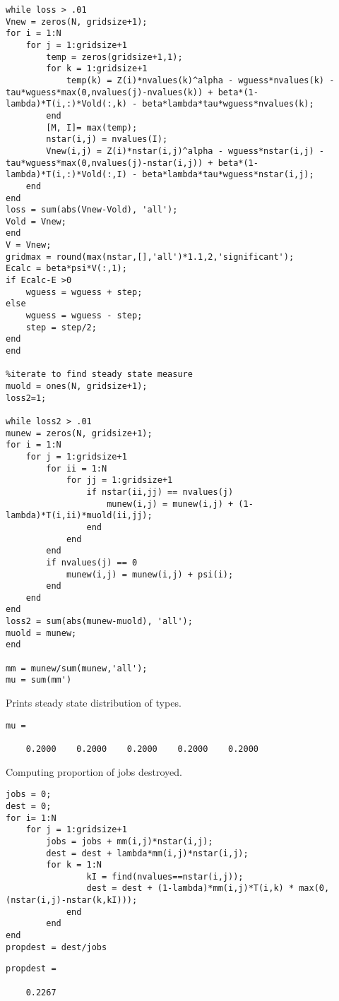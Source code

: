 \documentclass[12pt]{article}
\begin{document}
\begin{onehalfspace}
\begin{enumerate}[1.]
\begin{enumerate}
\begin{lstlisting}
while loss > .01
Vnew = zeros(N, gridsize+1);
for i = 1:N
    for j = 1:gridsize+1
        temp = zeros(gridsize+1,1);
        for k = 1:gridsize+1
            temp(k) = Z(i)*nvalues(k)^alpha - wguess*nvalues(k) - tau*wguess*max(0,nvalues(j)-nvalues(k)) + beta*(1-lambda)*T(i,:)*Vold(:,k) - beta*lambda*tau*wguess*nvalues(k);
        end
        [M, I]= max(temp);
        nstar(i,j) = nvalues(I);
        Vnew(i,j) = Z(i)*nstar(i,j)^alpha - wguess*nstar(i,j) - tau*wguess*max(0,nvalues(j)-nstar(i,j)) + beta*(1-lambda)*T(i,:)*Vold(:,I) - beta*lambda*tau*wguess*nstar(i,j);
    end
end
loss = sum(abs(Vnew-Vold), 'all');
Vold = Vnew;
end
V = Vnew;
gridmax = round(max(nstar,[],'all')*1.1,2,'significant');
Ecalc = beta*psi*V(:,1);
if Ecalc-E >0
    wguess = wguess + step;
else
    wguess = wguess - step;
    step = step/2;
end
end

%iterate to find steady state measure
muold = ones(N, gridsize+1);
loss2=1;

while loss2 > .01
munew = zeros(N, gridsize+1);
for i = 1:N
    for j = 1:gridsize+1
        for ii = 1:N
            for jj = 1:gridsize+1
                if nstar(ii,jj) == nvalues(j)
                    munew(i,j) = munew(i,j) + (1-lambda)*T(i,ii)*muold(ii,jj);
                end
            end
        end
        if nvalues(j) == 0
            munew(i,j) = munew(i,j) + psi(i);
        end
    end
end
loss2 = sum(abs(munew-muold), 'all');
muold = munew;
end

mm = munew/sum(munew,'all');
mu = sum(mm')
\end{lstlisting}
Prints steady state distribution of types.
\begin{lstlisting}
mu =

    0.2000    0.2000    0.2000    0.2000    0.2000
\end{lstlisting}
Computing proportion of jobs destroyed.
\begin{lstlisting}
jobs = 0;
dest = 0;
for i= 1:N
    for j = 1:gridsize+1
        jobs = jobs + mm(i,j)*nstar(i,j);
        dest = dest + lambda*mm(i,j)*nstar(i,j);
        for k = 1:N
                kI = find(nvalues==nstar(i,j));
                dest = dest + (1-lambda)*mm(i,j)*T(i,k) * max(0,(nstar(i,j)-nstar(k,kI)));
            end
        end
end
propdest = dest/jobs
\end{lstlisting}
\begin{lstlisting}
propdest =

    0.2267
\end{lstlisting}
    \end{enumerate}
    

\end{enumerate}
\end{onehalfspace}
\end{document}

